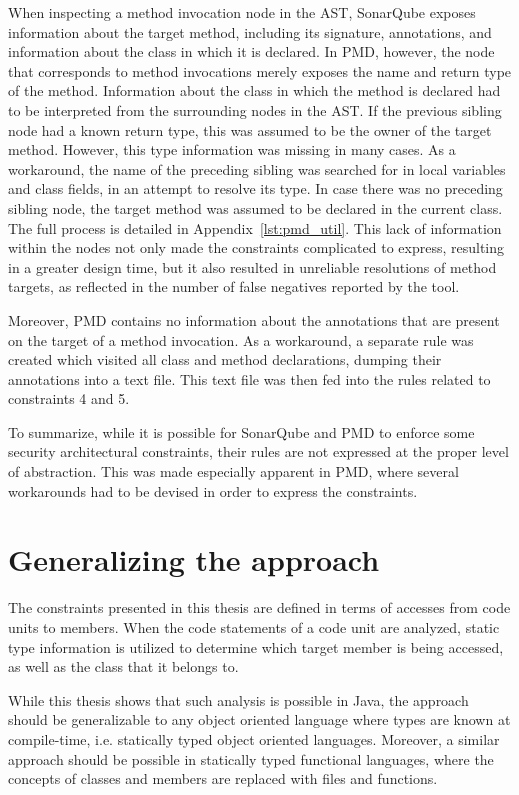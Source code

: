 When inspecting a method invocation node in the AST, SonarQube exposes information about the target method, including its signature, annotations, and information about the class in which it is declared. In PMD, however, the node that corresponds to method invocations merely exposes the name and return type of the method. Information about the class in which the method is declared had to be interpreted from the surrounding nodes in the AST. If the previous sibling node had a known return type, this was assumed to be the owner of the target method. However, this type information was missing in many cases. As a workaround, the name of the preceding sibling was searched for in local variables and class fields, in an attempt to resolve its type. In case there was no preceding sibling node, the target method was assumed to be declared in the current class. The full process is detailed in Appendix~\ref{lst:pmd_util}. This lack of information within the nodes not only made the constraints complicated to express, resulting in a greater design time, but it also resulted in unreliable resolutions of method targets, as reflected in the number of false negatives reported by the tool.

Moreover, PMD contains no information about the annotations that are present on the target of a method invocation. As a workaround, a separate rule was created which visited all class and method declarations, dumping their annotations into a text file. This text file was then fed into the rules related to constraints 4 and 5.

To summarize, while it is possible for SonarQube and PMD to enforce some security architectural constraints, their rules are not expressed at the proper level of abstraction. This was made especially apparent in PMD, where several workarounds had to be devised in order to express the constraints.


\section{Generalizing the approach}
The constraints presented in this thesis are defined in terms of accesses from code units to members. When the code statements of a code unit are analyzed, static type information is utilized to determine which target member is being accessed, as well as the class that it belongs to.

While this thesis shows that such analysis is possible in Java, the approach should be generalizable to any object oriented language where types are known at compile-time, i.e. statically typed object oriented languages.
Moreover, a similar approach should be possible in statically typed functional languages, where the concepts of classes and members are replaced with files and functions.

